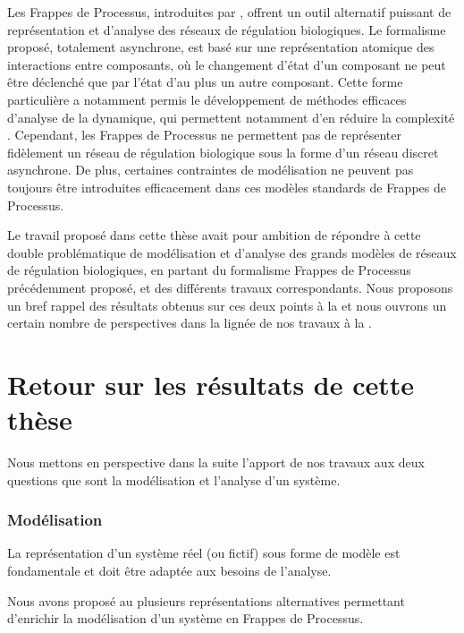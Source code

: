Les Frappes de Processus, introduites par ,
offrent un outil alternatif puissant de représentation et d'analyse des
réseaux de régulation biologiques.
Le formalisme proposé, totalement asynchrone, est basé sur une représentation
atomique des interactions entre composants,
où le changement d'état d'un composant ne peut être déclenché que par l'état d'au plus
un autre composant.
Cette forme particulière a notamment permis le développement de méthodes efficaces
d'analyse de la dynamique, qui permettent notamment d'en réduire la complexité \cite{PMR12-MSCS}.
Cependant, les Frappes de Processus ne permettent pas de représenter fidèlement
un réseau de régulation biologique sous la forme d'un réseau discret asynchrone.
De plus, certaines contraintes de modélisation ne peuvent pas toujours être introduites
efficacement dans ces modèles standards de Frappes de Processus.

Le travail proposé dans cette thèse avait pour ambition de répondre à cette double problématique
de modélisation et d'analyse des grands modèles de réseaux de régulation biologiques,
en partant du formalisme Frappes de Processus précédemment proposé,
et des différents travaux correspondants.
Nous proposons un bref rappel des résultats obtenus sur ces deux points à la 
et nous ouvrons un certain nombre de perspectives dans la lignée de nos travaux
à la .



\section{Retour sur les résultats de cette thèse}

Nous mettons en perspective dans la suite l'apport de nos travaux aux deux questions
que sont la modélisation et l'analyse d'un système.

\subsubsection*{Modélisation}

La représentation d'un système réel (ou fictif) sous forme de modèle est fondamentale
et doit être adaptée aux besoins de l'analyse.

\myskip

Nous avons proposé au  plusieurs représentations alternatives
permettant d'enrichir la modélisation d'un système en Frappes de Processus.

